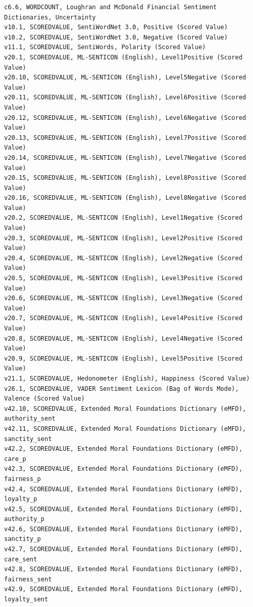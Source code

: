 \documentclass[12pt]{article}
\begin{document}
\begin{verbatim}
c6.6, WORDCOUNT, Loughran and McDonald Financial Sentiment Dictionaries, Uncertainty
v10.1, SCOREDVALUE, SentiWordNet 3.0, Positive (Scored Value)
v10.2, SCOREDVALUE, SentiWordNet 3.0, Negative (Scored Value)
v11.1, SCOREDVALUE, SentiWords, Polarity (Scored Value)
v20.1, SCOREDVALUE, ML-SENTICON (English), Level1Positive (Scored Value)
v20.10, SCOREDVALUE, ML-SENTICON (English), Level5Negative (Scored Value)
v20.11, SCOREDVALUE, ML-SENTICON (English), Level6Positive (Scored Value)
v20.12, SCOREDVALUE, ML-SENTICON (English), Level6Negative (Scored Value)
v20.13, SCOREDVALUE, ML-SENTICON (English), Level7Positive (Scored Value)
v20.14, SCOREDVALUE, ML-SENTICON (English), Level7Negative (Scored Value)
v20.15, SCOREDVALUE, ML-SENTICON (English), Level8Positive (Scored Value)
v20.16, SCOREDVALUE, ML-SENTICON (English), Level8Negative (Scored Value)
v20.2, SCOREDVALUE, ML-SENTICON (English), Level1Negative (Scored Value)
v20.3, SCOREDVALUE, ML-SENTICON (English), Level2Positive (Scored Value)
v20.4, SCOREDVALUE, ML-SENTICON (English), Level2Negative (Scored Value)
v20.5, SCOREDVALUE, ML-SENTICON (English), Level3Positive (Scored Value)
v20.6, SCOREDVALUE, ML-SENTICON (English), Level3Negative (Scored Value)
v20.7, SCOREDVALUE, ML-SENTICON (English), Level4Positive (Scored Value)
v20.8, SCOREDVALUE, ML-SENTICON (English), Level4Negative (Scored Value)
v20.9, SCOREDVALUE, ML-SENTICON (English), Level5Positive (Scored Value)
v21.1, SCOREDVALUE, Hedonometer (English), Happiness (Scored Value)
v26.1, SCOREDVALUE, VADER Sentiment Lexicon (Bag of Words Mode), Valence (Scored Value)
v42.10, SCOREDVALUE, Extended Moral Foundations Dictionary (eMFD), authority_sent
v42.11, SCOREDVALUE, Extended Moral Foundations Dictionary (eMFD), sanctity_sent
v42.2, SCOREDVALUE, Extended Moral Foundations Dictionary (eMFD), care_p
v42.3, SCOREDVALUE, Extended Moral Foundations Dictionary (eMFD), fairness_p
v42.4, SCOREDVALUE, Extended Moral Foundations Dictionary (eMFD), loyalty_p
v42.5, SCOREDVALUE, Extended Moral Foundations Dictionary (eMFD), authority_p
v42.6, SCOREDVALUE, Extended Moral Foundations Dictionary (eMFD), sanctity_p
v42.7, SCOREDVALUE, Extended Moral Foundations Dictionary (eMFD), care_sent
v42.8, SCOREDVALUE, Extended Moral Foundations Dictionary (eMFD), fairness_sent
v42.9, SCOREDVALUE, Extended Moral Foundations Dictionary (eMFD), loyalty_sent
\end{verbatim}
\end{document}
